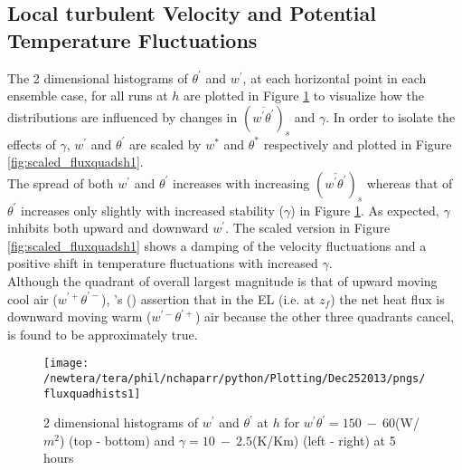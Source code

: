 
\clearpage

\subsection{Local turbulent Velocity and Potential Temperature Fluctuations}
\label{subsec:fluxquadrants}     
\FloatBarrier

The 2 dimensional histograms of $\theta^{'}$ and $w^{'}$, at each horizontal point in each ensemble case, for all runs at $h$ are plotted in Figure \ref{fig:fluxquadsh1} to visualize how the distributions are influenced by changes in $(\overline{w^{'} \theta^{'}})_{s}$ and $\gamma$.  In order to isolate the effects of $\gamma$,  $w^{'}$ and $\theta^{'}$ are scaled by $w^{*}$ and $\theta^{*}$ respectively and plotted in Figure \ref{fig:scaled_fluxquadsh1}.\\

The spread of both $w^{'}$ and $\theta^{'}$ increases with increasing $(\overline{w^{'}\theta^{'}})_{s}$ whereas that of $\theta^{'}$ increases only slightly with increased stability ($\gamma$) in Figure \ref{fig:fluxquadsh1}.  As expected, $\gamma$ inhibits both upward and downward $w^{'}$. The scaled version in Figure \ref{fig:scaled_fluxquadsh1} shows a damping of the velocity fluctuations and a positive shift in temperature fluctuations with increased $\gamma$.\\ 

Although the quadrant of overall largest magnitude is that of upward moving cool air ($w^{'+}\theta^{'-}$), \citeauthor{SullMoengStev}'s (\citeyear{SullMoengStev}) assertion that in the \acs{EL} (i.e. at $z_{f}$) the net heat flux is downward moving warm ($w^{'-}\theta^{'+}$) air because the other three quadrants cancel, is found to be approximately true.\\


\begin{figure}[htbp]
\centering
 \texttt{[image: /newtera/tera/phil/nchaparr/python/Plotting/Dec252013/pngs/fluxquadhists1]}                 
\caption[2D distributions of $w^{'}$ and $\theta^{'}$ for all runs]{ 2 dimensional histograms of $w^{'}$ and $\theta^{'}$ at $h$ for $w^{'}\theta^{'} = 150 \ - \ 60$(W/$m^{2}$) (top - bottom) and $\gamma = 10 \ - \  2.5$(K/Km) (left - right) at 5 hours}
\label{fig:fluxquadsh1}
\end{figure}

